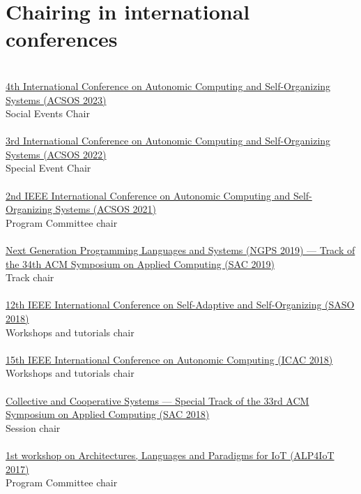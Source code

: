 \section{{\color{black}Chairing in international conferences}}
\halfblankline \\
\href{https://conf.researchr.org/home/acsos-2023/}{4th International Conference on Autonomic Computing and Self-Organizing Systems
(ACSOS 2023)}
\\ Social Events Chair \\
\halfblankline \\
\href{https://conf.researchr.org/home/acsos-2022/}{3rd International Conference on Autonomic Computing and Self-Organizing Systems
(ACSOS 2022)}
\\ Special Event Chair \\
\halfblankline \\
\href{https://conf.researchr.org/home/acsos-2021}{2nd IEEE International Conference on Autonomic Computing and Self-Organizing Systems 
(ACSOS 2021)}
\\ Program Committee chair \\
\halfblankline \\
\href{https://ngps2019.github.io/}{Next Generation Programming Languages and Systems (NGPS 2019) --- 
Track of the 34th ACM Symposium on Applied Computing (SAC 2019)}
\\ Track chair \\
\halfblankline \\
\href{https://saso2018.fbk.eu/}{12th IEEE International Conference on Self-Adaptive and Self-Organizing (SASO 2018)}
\\ Workshops and tutorials chair \\
\halfblankline \\
\href{http://icac2018.informatik.uni-wuerzburg.de/committees/organization-committee/}{15th IEEE International Conference on Autonomic Computing (ICAC 2018)}
\\ Workshops and tutorials chair \\
\halfblankline \\
\href{http://sac-cas2018.apice.unibo.it/referees.html}{Collective and Cooperative Systems --- Special Track of the 33rd ACM Symposium on Applied Computing (SAC 2018)}
\\ Session chair \\
\halfblankline \\
\href{http://apice.unibo.it/xwiki/bin/view/ALP4IoT2016/WebHome}{1st workshop on Architectures, Languages and Paradigms for IoT (ALP4IoT 2017)}
\\ Program Committee chair \\

